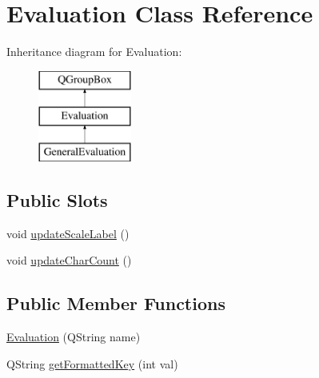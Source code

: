 \hypertarget{class_evaluation}{\section{Evaluation Class Reference}
\label{class_evaluation}
}
Inheritance diagram for Evaluation\-:\begin{figure}[H]
\begin{center}
\leavevmode
\includegraphics[height=3.000000cm]{class_evaluation}
\end{center}
\end{figure}
\subsection*{Public Slots}
\begin{DoxyCompactItemize}
\item 
void \hyperlink{class_evaluation_affda67750e1fe39d0a066d8850d82abe}{update\-Scale\-Label} ()
\item 
void \hyperlink{class_evaluation_ab2bb3e38d27fa614a094801fa2c656bb}{update\-Char\-Count} ()
\end{DoxyCompactItemize}
\subsection*{Public Member Functions}
\begin{DoxyCompactItemize}
\item 
\hyperlink{class_evaluation_a637c363512d52b26eb5e8ad09d19ff39}{Evaluation} (Q\-String name)
\item 
Q\-String \hyperlink{class_evaluation_a4fbd59ac8bf621c52367fea1f2ff2d3e}{get\-Formatted\-Key} (int val)
\end{DoxyCompactItemize}
